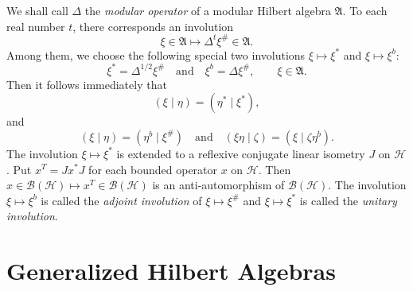\documentclass[12pt,b5paper,twoside]{article}
\theoremstyle{takesaki}
\numberwithin{equation}{section}
\begin{document}
We shall call $\Delta$ the \emph{modular operator} of a modular Hilbert
algebra $\mathfrak A$.  To each real number $t$, there corresponds an
involution
\[
  \xi\in\mathfrak A\longmapsto\Delta^t\xi^\#\in\mathfrak A.
\]
Among them, we choose the following special two involutions
$\xi\mapsto\xi^*$ and $\xi\mapsto\xi^b$:
\begin{equation}
  \xi^*=\Delta^{1/2}\xi^\#
  \quad\text{and}\quad
  \xi^b=\Delta\xi^\#,\qquad \xi\in\mathfrak A.
  \tag{2.1}\label{eq:2.1}
\end{equation}
Then it follows immediately that
\begin{equation}
  (\xi\mid\eta)=(\eta^*\mid\xi^*),
  \tag{2.2}\label{eq:2.2}
\end{equation}
and
\begin{equation}
  (\xi\mid\eta)=(\eta^b\mid\xi^\#)
  \quad\text{and}\quad
  (\xi\eta\mid\zeta)=(\xi\mid\zeta\eta^b).
  \tag{2.3}\label{eq:2.3}
\end{equation}
The involution $\xi\mapsto\xi^*$ is extended to a reflexive conjugate
linear isometry $J$ on $\mathcal H$.  Put $x^T=Jx^*J$ for each bounded
operator $x$ on $\mathcal H$.  Then
$x\in\mathcal B(\mathcal H)\mapsto x^T\in\mathcal B(\mathcal H)$ is an
anti-automorphism of $\mathcal B(\mathcal H)$.  The involution
$\xi\mapsto\xi^b$ is called the \emph{adjoint involution} of
$\xi\mapsto\xi^\#$ and $\xi\mapsto\xi^*$ is called the \emph{unitary
involution}.

\section{Generalized Hilbert Algebras}\label{sec:3}
\end{document}

